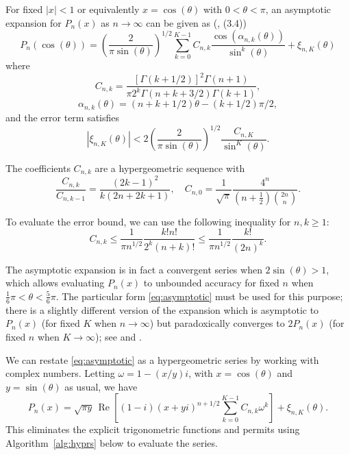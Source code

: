 \documentclass[11pt,a4paper]{article}
\begin{document}
For fixed $|x| < 1$ or equivalently $x = \cos(\theta)$ with $0 < \theta < \pi$,
an asymptotic expansion for $P_n(x)$ as $n \to \infty$
can be given as (\cite{Bogaert2012}, (3.4))
\begin{equation}
\label{eq:asymptotic}
P_n(\cos(\theta)) = \left(\frac{2}{\pi \sin(\theta)}\right)^{1/2}
\sum_{k=0}^{K-1} C_{n,k} \frac{\cos(\alpha_{n,k}(\theta))}{\sin^k(\theta)}
+ \xi_{n,K}(\theta)
\end{equation}
where
\begin{equation}
C_{n,k} = \frac{[\Gamma(k+1/2)]^2 \Gamma(n+1)}{\pi 2^k \Gamma(n+k+3/2) \Gamma(k+1)},
\end{equation}
\begin{equation}
\alpha_{n,k}(\theta) = (n+k+1/2) \theta - (k+1/2) \pi / 2,
\end{equation}
and the error term satisfies
\begin{equation}
\label{eq:truncerr0}
|\xi_{n,K}(\theta)| < 2 \left(\frac{2}{\pi \sin(\theta)}\right)^{1/2} \frac{C_{n,K}}{\sin^K(\theta)}.
\end{equation}

The coefficients $C_{n,k}$ are a hypergeometric sequence with
$$\frac{C_{n,k}}{C_{n,k-1}} = \frac{(2k-1)^2}{k (2n+2k+1)}, \quad C_{n,0} = \frac{1}{\sqrt{\pi}} \frac{4^n}{(n+\tfrac{1}{2}) {2n \choose n}}.$$

To evaluate the error bound, we can use the following inequality for $n, k \ge 1$:
\begin{equation}
\label{eq:truncerr0b}
C_{n,k} \le \frac{1}{\pi n^{1/2}} \frac{k! n!}{2^k (n+k)!} \le \frac{1}{\pi n^{1/2}} \frac{k!}{(2n)^k}.
\end{equation}

The asymptotic expansion is in fact a convergent series
when $2 \sin(\theta) > 1$, which allows evaluating $P_n(x)$ to unbounded
accuracy for fixed $n$ when $\tfrac{1}{6}\pi < \theta < \tfrac{5}{6} \pi$.
The particular form \eqref{eq:asymptotic}
must be used for this purpose; there is a slightly different version of the expansion
which is asymptotic to $P_n(x)$ (for fixed $K$ when $n \to \infty$)
but paradoxically
converges to $2 P_n(x)$ (for fixed $n$ when $K \to \infty$); see \cite{Olver1997} and \cite{Olver2010}.

We can restate \eqref{eq:asymptotic} as a hypergeometric series
by working with complex numbers.
Letting $\omega = 1 - (x/y) i$, with $x = \cos(\theta)$ and $y =
\sin(\theta)$ as usual, we have
\begin{equation}
\label{eq:asymptoticcomplex}
P_n(x) = \sqrt{\pi y} \, \operatorname{Re}\left[
(1-i) (x+y i)^{n+1/2}
\sum_{k=0}^{K-1} C_{n,k} \omega^k\right] + \xi_{n,K}(\theta).
\end{equation}
This eliminates the explicit trigonometric functions and permits using
Algorithm~\ref{alg:hyprs} below to evaluate the series.
\end{document}
